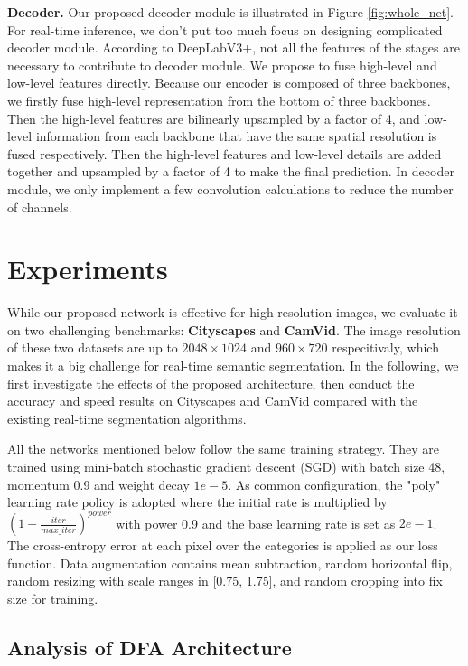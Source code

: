 \documentclass[10pt,twocolumn,letterpaper]{article}
\begin{document}
\textbf{Decoder.} Our proposed decoder module is illustrated in Figure \ref{fig:whole_net}. For real-time inference, we don't put too much focus on designing complicated decoder module. According to DeepLabV3+\cite{deeplabv3plus}, not all the features of the stages are necessary to contribute to decoder module. We propose to fuse high-level and low-level features directly. Because our encoder is composed of three backbones, we firstly fuse high-level representation from the bottom of three backbones. Then the high-level features are bilinearly upsampled by a factor of 4, and low-level information from each backbone that have the same spatial resolution is fused respectively. Then the high-level features and low-level details are added together and upsampled by a factor of 4 to make the final prediction. In decoder module, we only implement a few convolution calculations to reduce the number of channels.

\section{Experiments}
While our proposed network is effective for high resolution images, we evaluate it on two challenging benchmarks: \textbf{Cityscapes} and \textbf{CamVid}. The image resolution of these two datasets are up to $2048\times1024$ and $960\times720$ respecitivaly, which makes it a big challenge for real-time semantic segmentation. In the following, we first investigate the effects of the proposed architecture, then conduct the accuracy and speed results on Cityscapes and CamVid compared with the existing real-time segmentation algorithms. 

All the networks mentioned below follow the same training strategy. They are trained using mini-batch stochastic gradient descent (SGD) with batch size 48, momentum 0.9 and weight decay $1e-5$. As common configuration, the "poly" learning rate policy is adopted where the initial rate is multiplied by $(1-\frac{iter}{max\_iter})^{power}$ with power 0.9 and the base learning rate is set as $2e-1$. The cross-entropy error at each pixel over the categories is applied as our loss function. Data augmentation contains mean subtraction, random horizontal flip, random resizing with scale ranges in [0.75, 1.75], and random cropping into fix size for training.

\subsection{Analysis of DFA Architecture}
\end{document}
